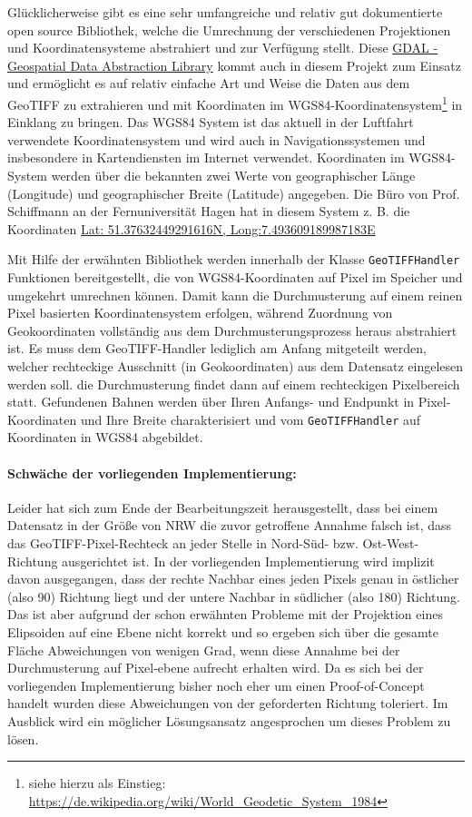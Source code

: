 \documentclass[10pt,a4paper]{report}
\begin{document}
Glücklicherweise gibt es eine sehr umfangreiche und relativ gut dokumentierte open source Bibliothek, welche die Umrechnung der verschiedenen Projektionen und Koordinatensysteme abstrahiert und zur Verfügung stellt. Diese \href{http://www.gdal.org/}{GDAL - Geospatial Data Abstraction Library} kommt auch in diesem Projekt zum Einsatz und ermöglicht es auf relativ einfache Art und Weise die Daten aus dem GeoTIFF zu extrahieren und mit Koordinaten im WGS84-Koordinatensystem\footnote{siehe hierzu als Einstieg: \href{https://de.wikipedia.org/wiki/World_Geodetic_System_1984}{https://de.wikipedia.org/wiki/World\_Geodetic\_System\_1984}} in Einklang zu bringen. Das WGS84 System ist das aktuell in der Luftfahrt verwendete Koordinatensystem und wird auch in Navigationssystemen und insbesondere in Kartendiensten im Internet verwendet. Koordinaten im WGS84-System werden über die bekannten zwei Werte von geographischer Länge (Longitude) und geographischer Breite (Latitude) angegeben. Die Büro von Prof. Schiffmann an der Fernuniversität Hagen hat in diesem System z. B. die Koordinaten \href{http://bl.ocks.org/d/94faa16e1c8cb9d9226902f9fb0cc36c}{Lat: 51.37632449291616N, Long:7.493609189987183E}

Mit Hilfe der erwähnten Bibliothek werden innerhalb der Klasse \texttt{GeoTIFFHandler} Funktionen bereitgestellt, die von WGS84-Koordinaten auf Pixel im Speicher und umgekehrt umrechnen können. Damit kann die Durchmusterung auf einem reinen Pixel basierten Koordinatensystem erfolgen, während Zuordnung von Geokoordinaten vollständig aus dem Durchmusterungsprozess heraus abstrahiert ist. Es muss dem GeoTIFF-Handler lediglich am Anfang mitgeteilt werden, welcher rechteckige Ausschnitt (in Geokoordinaten) aus dem Datensatz eingelesen werden soll. die Durchmusterung findet dann auf einem rechteckigen Pixelbereich statt. Gefundenen Bahnen werden über Ihren Anfangs- und Endpunkt in Pixel-Koordinaten und Ihre Breite charakterisiert und vom \texttt{GeoTIFFHandler} auf Koordinaten in WGS84 abgebildet.

\paragraph{Schwäche der vorliegenden Implementierung:} Leider hat sich zum Ende der Bearbeitungszeit herausgestellt, dass bei einem Datensatz in der Größe von NRW die zuvor getroffene Annahme falsch ist, dass das GeoTIFF-Pixel-Rechteck an jeder Stelle in Nord-Süd- bzw. Ost-West-Richtung ausgerichtet ist. In der vorliegenden Implementierung wird implizit davon ausgegangen, dass der rechte Nachbar eines jeden Pixels genau in östlicher (also 90\degree) Richtung liegt und der untere Nachbar in südlicher (also 180\degree) Richtung. Das ist aber aufgrund der schon erwähnten Probleme mit der Projektion eines Elipsoiden auf eine Ebene nicht korrekt und so ergeben sich über die gesamte Fläche Abweichungen von wenigen Grad, wenn diese Annahme bei der Durchmusterung auf Pixel-ebene aufrecht erhalten wird. Da es sich bei der vorliegenden Implementierung bisher noch eher um einen Proof-of-Concept handelt wurden diese Abweichungen von der geforderten Richtung toleriert. Im Ausblick wird ein möglicher Lösungsansatz angesprochen um dieses Problem zu lösen.
\end{document}

